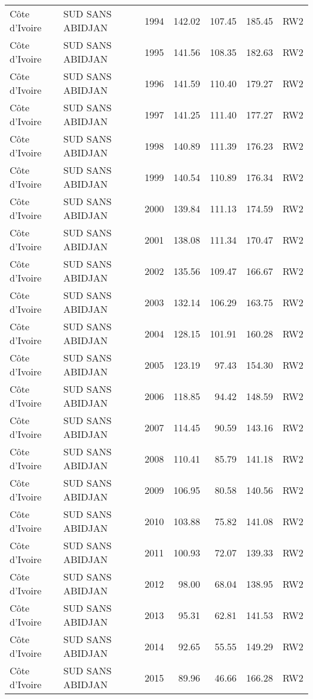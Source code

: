 \begin{longtable}{lllrrrl}
  C\^{o}te d'Ivoire & SUD SANS ABIDJAN & 1994 & 142.02 & 107.45 & 185.45 & RW2 \\ 
  C\^{o}te d'Ivoire & SUD SANS ABIDJAN & 1995 & 141.56 & 108.35 & 182.63 & RW2 \\ 
  C\^{o}te d'Ivoire & SUD SANS ABIDJAN & 1996 & 141.59 & 110.40 & 179.27 & RW2 \\ 
  C\^{o}te d'Ivoire & SUD SANS ABIDJAN & 1997 & 141.25 & 111.40 & 177.27 & RW2 \\ 
  C\^{o}te d'Ivoire & SUD SANS ABIDJAN & 1998 & 140.89 & 111.39 & 176.23 & RW2 \\ 
  C\^{o}te d'Ivoire & SUD SANS ABIDJAN & 1999 & 140.54 & 110.89 & 176.34 & RW2 \\ 
  C\^{o}te d'Ivoire & SUD SANS ABIDJAN & 2000 & 139.84 & 111.13 & 174.59 & RW2 \\ 
  C\^{o}te d'Ivoire & SUD SANS ABIDJAN & 2001 & 138.08 & 111.34 & 170.47 & RW2 \\ 
  C\^{o}te d'Ivoire & SUD SANS ABIDJAN & 2002 & 135.56 & 109.47 & 166.67 & RW2 \\ 
  C\^{o}te d'Ivoire & SUD SANS ABIDJAN & 2003 & 132.14 & 106.29 & 163.75 & RW2 \\ 
  C\^{o}te d'Ivoire & SUD SANS ABIDJAN & 2004 & 128.15 & 101.91 & 160.28 & RW2 \\ 
  C\^{o}te d'Ivoire & SUD SANS ABIDJAN & 2005 & 123.19 & 97.43 & 154.30 & RW2 \\ 
  C\^{o}te d'Ivoire & SUD SANS ABIDJAN & 2006 & 118.85 & 94.42 & 148.59 & RW2 \\ 
  C\^{o}te d'Ivoire & SUD SANS ABIDJAN & 2007 & 114.45 & 90.59 & 143.16 & RW2 \\ 
  C\^{o}te d'Ivoire & SUD SANS ABIDJAN & 2008 & 110.41 & 85.79 & 141.18 & RW2 \\ 
  C\^{o}te d'Ivoire & SUD SANS ABIDJAN & 2009 & 106.95 & 80.58 & 140.56 & RW2 \\ 
  C\^{o}te d'Ivoire & SUD SANS ABIDJAN & 2010 & 103.88 & 75.82 & 141.08 & RW2 \\ 
  C\^{o}te d'Ivoire & SUD SANS ABIDJAN & 2011 & 100.93 & 72.07 & 139.33 & RW2 \\ 
  C\^{o}te d'Ivoire & SUD SANS ABIDJAN & 2012 & 98.00 & 68.04 & 138.95 & RW2 \\ 
  C\^{o}te d'Ivoire & SUD SANS ABIDJAN & 2013 & 95.31 & 62.81 & 141.53 & RW2 \\ 
  C\^{o}te d'Ivoire & SUD SANS ABIDJAN & 2014 & 92.65 & 55.55 & 149.29 & RW2 \\ 
  C\^{o}te d'Ivoire & SUD SANS ABIDJAN & 2015 & 89.96 & 46.66 & 166.28 & RW2 \\ 

\end{longtable}
